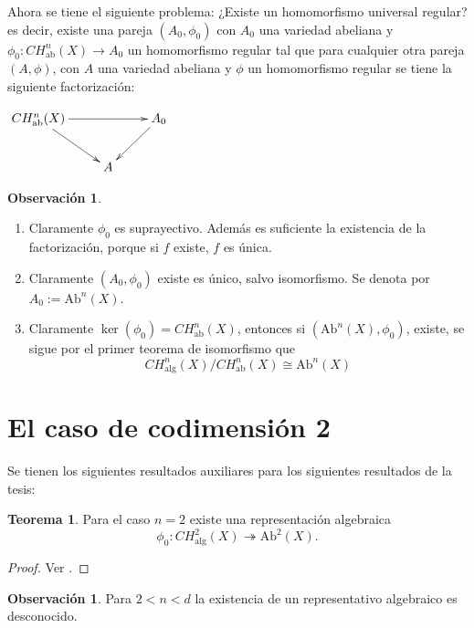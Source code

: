 \documentclass[10pt]{amsart}
\theoremstyle{definition}
\newtheorem{obs}[definition]{Observaci\'on}
\newtheorem{theorem}[definition]{Teorema}
\theoremstyle{remark}
\theoremstyle{definition}
\begin{document}
Ahora se tiene el siguiente problema:
¿Existe un homomorfismo universal regular? es decir, existe una pareja $(A_{0},\phi_{0})$ con $A_{0}$ una variedad abeliana y $\phi_{0}:CH^{n}_{\mathrm{ab}}(X) \rightarrow A_{0}$ un homomorfismo regular tal que para cualquier otra pareja $(A,\phi)$, con $A$ una variedad abeliana y $\phi$ un homomorfismo regular se tiene la siguiente factorización:

\begin{center}
		$\xymatrix{
			CH^{n}_{\mathrm{ab}}(X)  \ar[rr] \ar[dr]  & & A_{0}\ar[dl]\\
			& A & }
		$ 
	\end{center}


\begin{obs}
\begin{enumerate}
\item Claramente $\phi_{0}$ es suprayectivo. Además es suficiente la existencia de la factorización, porque si $f$ existe, $f$ es única.
\item Claramente $(A_{0},\phi_{0})$ existe es único, salvo isomorfismo. Se denota por $A_{0}:=\mathrm{Ab}^{n}(X)$.
\item Claramente $\ker(\phi_{0})=CH^{n}_{\mathrm{ab}}(X) $, entonces si $(\mathrm{Ab}^{n}(X),\phi_{0})$, existe, se sigue por el primer teorema de isomorfismo que 
\begin{equation*}
CH^{n}_{\mathrm{alg}}(X)/CH^{n}_{\mathrm{ab}}(X) \cong \mathrm{Ab}^{n}(X)
\end{equation*}
\end{enumerate}
\end{obs}

\section{El caso de codimensión 2}
Se tienen los siguientes resultados auxiliares para los siguientes resultados de la tesis:
\begin{theorem}
Para el caso $n=2$ existe una representación algebraica
\begin{equation*}
\phi_{0}:CH^{2}_{\mathrm{alg}}(X) \twoheadrightarrow \mathrm{Ab}^{2}(X).
\end{equation*}
 \end{theorem}

\begin{proof}
Ver \cite[Thm. 1.9]{Mur85}.
\end{proof}

\begin{obs}
Para $2<n<d$ la existencia de un representativo algebraico es desconocido.
\end{obs}
\end{document}
